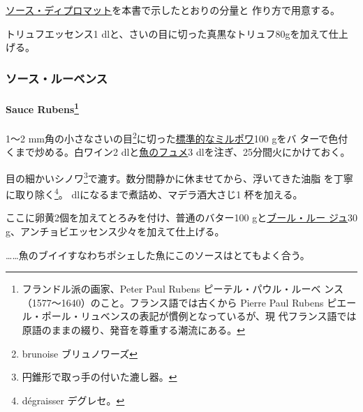 \begin{recette}
 

\protect\hyperlink{sauce-diplomate}{ソース・ディプロマット}を本書で示したとおりの分量と
作り方で用意する。

トリュフエッセンス1
dlと、さいの目に切った真黒なトリュフ80gを加えて仕上げる。

\maeaki

\hypertarget{ux30bdux30fcux30b9ux30ebux30fcux30d9ux30f3ux30b9}{%
\subsubsection{ソース・ルーベンス}\label{ux30bdux30fcux30b9ux30ebux30fcux30d9ux30f3ux30b9}}

\hypertarget{sauce-rubens122}{%
\paragraph[Sauce Rubens]{\texorpdfstring{Sauce Rubens\footnote{フランドル派の画家、Peter
  Paul Rubens ピーテル・パウル・ルーベ
  ンス（1577〜1640）のこと。フランス語では古くから Pierre Paul Rubens
  ピエール・ポール・リュベンスの表記が慣例となっているが、現
  代フランス語では原語のままの綴り、発音を尊重する潮流にある。}}{Sauce Rubens}}\label{sauce-rubens122}}


1〜2 mm角の小さなさいの目\footnote{brunoise ブリュノワーズ}に切った\protect\hyperlink{}{標準的なミルポワ}100
gをバ ターで色付くまで炒める。白ワイン2
dlと\protect\hyperlink{fumetux5cux2520deux5cux2520poisson}{魚のフュメ}3
dlを注ぎ、25分間火にかけておく。

目の細かいシノワ\footnote{円錐形で取っ手の付いた漉し器。}で漉す。数分間静かに休ませてから、浮いてきた油脂
を丁寧に取り除く\footnote{dégraisser デグレセ。}。\undemi{}
dlになるまで煮詰め、マデラ酒大さじ1 杯を加える。

ここに卵黄2個を加えてとろみを付け、普通のバター100
gと\protect\hyperlink{beurre-rouge}{ブール・ルー ジュ}30
g、アンチョビエッセンス少々を加えて仕上げる。

\ldots{}\ldots{}魚のブイイすなわちポシェした魚にこのソースはとてもよく合う。

\maeaki


\end{recette}
